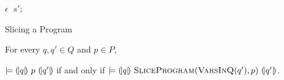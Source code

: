 \begin{algorithm}
  \begin{algorithmic}[1]
      \Case{$\epsilon$}
        \Return $\epsilon$
      \EndCase
            \Return {}
          \EndCase
            \Return {}$\ s';$
          \EndCase
        \EndMatch
      \EndCase
    \EndMatch
    \EndFunction
  \end{algorithmic}
  \caption{Slicing a Program}
\end{algorithm}

\begin{theorem}
  For every $q, q' \in Q$ and $p \in P$,
  \begin{center}
  $\models {(\!|}{q}{|\!)}~{p}~{(\!|}{q'}{|\!)}$ if and only if
  $\models {(\!|}{q}{|\!)}~{\textsc{SliceProgram}(\textsc{VarsInQ}(q'), p)}~{(\!|}{q'}{|\!)}$.
  \end{center}

\end{theorem}